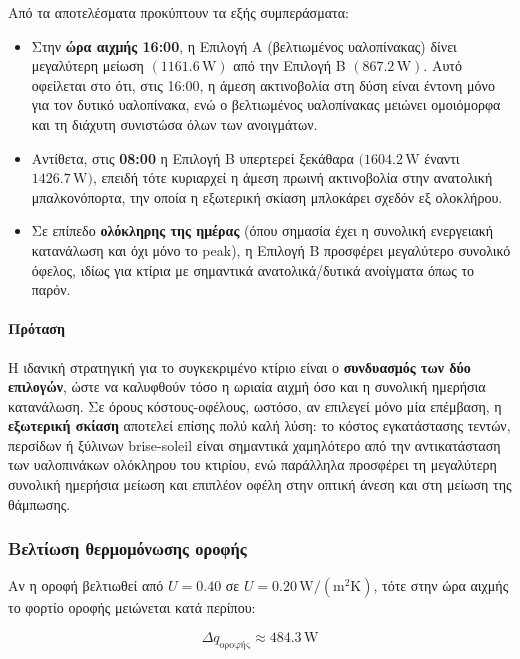 \documentclass[12pt,a4paper]{article}
\begin{document}
Από τα αποτελέσματα προκύπτουν τα εξής συμπεράσματα:

\begin{itemize}
\item Στην \textbf{ώρα αιχμής 16:00}, η Επιλογή Α (βελτιωμένος υαλοπίνακας) δίνει
μεγαλύτερη μείωση \((1161.6\,\mathrm{W})\) από την Επιλογή Β
\((867.2\,\mathrm{W})\). Αυτό οφείλεται στο ότι, στις 16:00, η άμεση ακτινοβολία
στη δύση είναι έντονη μόνο για τον δυτικό υαλοπίνακα, ενώ ο βελτιωμένος
υαλοπίνακας μειώνει ομοιόμορφα και τη διάχυτη συνιστώσα όλων των ανοιγμάτων.
\item Αντίθετα, στις \textbf{08:00} η Επιλογή Β υπερτερεί ξεκάθαρα
\((1604.2\,\mathrm{W}\) έναντι \(1426.7\,\mathrm{W})\), επειδή τότε κυριαρχεί η
άμεση πρωινή ακτινοβολία στην ανατολική μπαλκονόπορτα, την οποία η εξωτερική
σκίαση μπλοκάρει σχεδόν εξ ολοκλήρου.
\item Σε επίπεδο \textbf{ολόκληρης της ημέρας} (όπου σημασία έχει η συνολική
ενεργειακή κατανάλωση και όχι μόνο το peak), η Επιλογή Β προσφέρει μεγαλύτερο
συνολικό όφελος, ιδίως για κτίρια με σημαντικά ανατολικά/δυτικά ανοίγματα όπως
το παρόν.
\end{itemize}

\paragraph{Πρόταση}

Η ιδανική στρατηγική για το συγκεκριμένο κτίριο είναι ο \textbf{συνδυασμός των
δύο επιλογών}, ώστε να καλυφθούν τόσο η ωριαία αιχμή όσο και η συνολική
ημερήσια κατανάλωση. Σε όρους κόστους-οφέλους, ωστόσο, αν επιλεγεί μόνο μία
επέμβαση, η \textbf{εξωτερική σκίαση} αποτελεί επίσης πολύ καλή λύση: το κόστος
εγκατάστασης τεντών, περσίδων ή ξύλινων brise-soleil είναι σημαντικά
χαμηλότερο από την αντικατάσταση των υαλοπινάκων ολόκληρου του κτιρίου, ενώ
παράλληλα προσφέρει τη μεγαλύτερη συνολική ημερήσια μείωση και επιπλέον
οφέλη στην οπτική άνεση και στη μείωση της θάμπωσης.

\subsubsection{Βελτίωση θερμομόνωσης οροφής}

Αν η οροφή βελτιωθεί από \(U = 0.40\) σε \(U = 0.20\,\mathrm{W/(m^2K)}\), τότε στην ώρα
αιχμής το φορτίο οροφής μειώνεται κατά περίπου:

\[
\Delta q_{\text{οροφής}} \approx 484.3\,\mathrm{W}
\]
\end{document}
